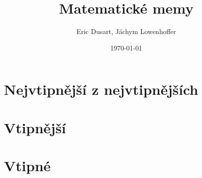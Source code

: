 \documentclass{article}
\title{Matematické memy}
\author{Eric Dusart, Jáchym Lowenhoffer}
\date{\today}
\begin{document}
\begin{titlepage}
\maketitle
\end{titlepage}

\part{Nejvtipnější z nejvtipnějších}
\label{part:nejvtipnejsi-z-nejvtipnejsich}


\part{Vtipnější}
\label{part:vtipnejsi}


\part{Vtipné}
\label{part:vtipne}

\end{document}
